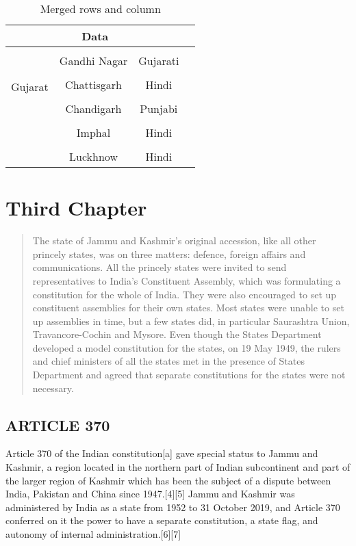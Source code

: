 \documentclass{book}
\begin{document}
\begin{center}
\begin{longtable}{|l|l|l|}
\end{longtable}

\begin{table}[]
    \centering
    \begin{tabular}{ |c|c|c|c| }
    \hline
    \multicolumn{3}{|c|}{Data}  \\
    \hline
    & & \\
    \multirow{6}{4em}{Gujarat} & Gandhi Nagar & Gujarati \\
    & & \\
    & Chattisgarh & Hindi \\
    & & \\
    & Chandigarh & Punjabi \\
    & & \\
    & Imphal & Hindi \\
    & & \\
    & Luckhnow & Hindi \\
    \hline
    \end{tabular}
    \caption{Merged rows and column}
    \label{tab:my_label}
    \end{table}
\end{center}


\chapter{Third Chapter}
\begin{abstract}
    The state of Jammu and Kashmir's original accession, like all other princely states, was on three matters: defence, foreign affairs and communications. All the princely states were invited to send representatives to India's Constituent Assembly, which was formulating a constitution for the whole of India. They were also encouraged to set up constituent assemblies for their own states. Most states were unable to set up assemblies in time, but a few states did, in particular Saurashtra Union, Travancore-Cochin and Mysore. Even though the States Department developed a model constitution for the states, on 19 May 1949, the rulers and chief ministers of all the states met in the presence of States Department and agreed that separate constitutions for the states were not necessary.
\end{abstract}

\section{ARTICLE 370}

Article 370 of the Indian constitution[a] gave special status to Jammu and Kashmir, a region located in the northern part of Indian subcontinent and part of the larger region of Kashmir which has been the subject of a dispute between India, Pakistan and China since 1947.[4][5] Jammu and Kashmir was administered by India as a state from 1952 to 31 October 2019, and Article 370 conferred on it the power to have a separate constitution, a state flag, and autonomy of internal administration.[6][7]
\end{document}

